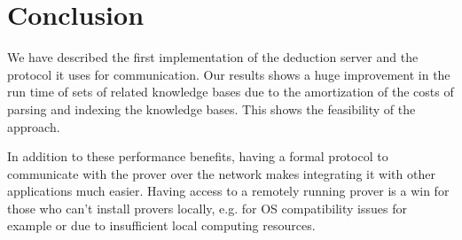 \chapter{Conclusion}\label{chap:concl}

We have described the first implementation of the deduction server and the protocol it uses for communication. Our results shows a huge improvement in the run time of sets of related knowledge bases due to the amortization of the costs of parsing and indexing the knowledge bases. This shows the feasibility of the approach.

 In addition to these performance benefits, having a formal protocol to communicate with the prover over the network makes integrating it with other applications much easier. Having access to a remotely running prover is a win for those who can't install provers locally, e.g. for OS compatibility issues for example or due to insufficient local computing resources.
